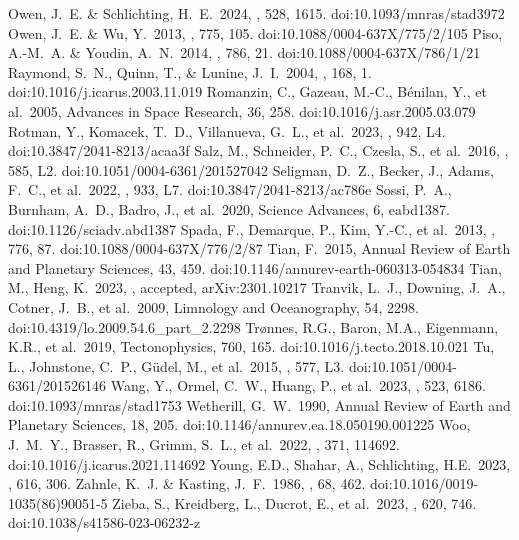 \documentclass[bibyear,tradiabstract]{aa}
\begin{document}
\begin{thebibliography}{}
     Owen, J.~E. \& Schlichting, H.~E.\ 2024, \mnras, 528, 1615. doi:10.1093/mnras/stad3972
     Owen, J.~E. \& Wu, Y.\ 2013, \apj, 775, 105. doi:10.1088/0004-637X/775/2/105
     Piso, A.-M.~A. \& Youdin, A.~N.\ 2014, \apj, 786, 21. doi:10.1088/0004-637X/786/1/21
     Raymond, S.~N., Quinn, T., \& Lunine, J.~I.\ 2004, \icarus, 168, 1. doi:10.1016/j.icarus.2003.11.019
     Romanzin, C., Gazeau, M.-C., B{\'e}nilan, Y., et al.\ 2005, Advances in Space Research, 36, 258. doi:10.1016/j.asr.2005.03.079
     Rotman, Y., Komacek, T.~D., Villanueva, G.~L., et al.\ 2023, \apjl, 942, L4. doi:10.3847/2041-8213/acaa3f
     Salz, M., Schneider, P.~C., Czesla, S., et al.\ 2016, \aap, 585, L2. doi:10.1051/0004-6361/201527042
     Seligman, D.~Z., Becker, J., Adams, F.~C., et al.\ 2022, \apjl, 933, L7. doi:10.3847/2041-8213/ac786e
     Sossi, P.~A., Burnham, A.~D., Badro, J., et al.\ 2020, Science Advances, 6, eabd1387. doi:10.1126/sciadv.abd1387
     Spada, F., Demarque, P., Kim, Y.-C., et al.\ 2013, \apj, 776, 87. doi:10.1088/0004-637X/776/2/87
     Tian, F.\ 2015, Annual Review of Earth and Planetary Sciences, 43, 459. doi:10.1146/annurev-earth-060313-054834
     Tian, M., Heng, K.\ 2023, \apj, accepted, arXiv:2301.10217
     Tranvik, L.~J., Downing, J.~A., Cotner, J.~B., et al.\ 2009, Limnology and Oceanography, 54, 2298. doi:10.4319/lo.2009.54.6\_part\_2.2298
     Trønnes, R.G., Baron, M.A., Eigenmann, K.R., et al.\ 2019, Tectonophysics, 760, 165. doi:10.1016/j.tecto.2018.10.021
     Tu, L., Johnstone, C.~P., G{\"u}del, M.,     et al.\ 2015, \aap, 577, L3. doi:10.1051/0004-6361/201526146
     Wang, Y., Ormel, C.~W., Huang, P., et al.\ 2023, \mnras, 523, 6186. doi:10.1093/mnras/stad1753
     Wetherill, G.~W.\ 1990, Annual Review of Earth and Planetary Sciences, 18, 205. doi:10.1146/annurev.ea.18.050190.001225
     Woo, J.~M.~Y., Brasser, R., Grimm, S.~L., et al.\ 2022, \icarus, 371, 114692. doi:10.1016/j.icarus.2021.114692
     Young, E.D., Shahar, A., Schlichting, H.E.\ 2023, \nat, 616, 306.
     Zahnle, K.~J. \& Kasting, J.~F.\ 1986, \icarus, 68, 462. doi:10.1016/0019-1035(86)90051-5
     Zieba, S., Kreidberg, L., Ducrot, E., et al.\ 2023, \nat, 620, 746. doi:10.1038/s41586-023-06232-z
 

\end{thebibliography}
\end{document}

